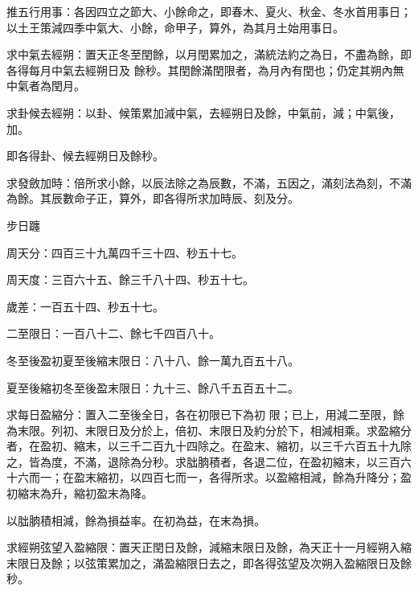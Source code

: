 \begin{pinyinscope}
 推五行用事：各因四立之節大、小餘命之，即春木、夏火、秋金、冬水首用事日；以土王策減四季中氣大、小餘，命甲子，算外，為其月土始用事日。



 求中氣去經朔：置天正冬至閏餘，以月閏累加之，滿統法約之為日，不盡為餘，即各得每月中氣去經朔日及
 餘秒。其閏餘滿閏限者，為月內有閏也；仍定其朔內無中氣者為閏月。



 求卦候去經朔：以卦、候策累加減中氣，去經朔日及餘，中氣前，減；中氣後，加。



 即各得卦、候去經朔日及餘秒。



 求發斂加時：倍所求小餘，以辰法除之為辰數，不滿，五因之，滿刻法為刻，不滿為餘。其辰數命子正，算外，即各得所求加時辰、刻及分。



 步日躔



 周天分：四百三十九萬四千三十四、秒五十七。



 周天度：三百六十五、餘三千八十四、秒五十七。



 歲差：一百五十四、秒五十七。



 二至限日：一百八十二、餘七千四百八十。



 冬至後盈初夏至後縮末限日：八十八、餘一萬九百五十八。



 夏至後縮初冬至後盈末限日：九十三、餘八千五百五十二。



 求每日盈縮分：置入二至後全日，各在初限已下為初
 限；已上，用減二至限，餘為末限。列初、末限日及分於上，倍初、末限日及約分於下，相減相乘。求盈縮分者，在盈初、縮末，以三千二百九十四除之。在盈末、縮初，以三千六百五十九除之，皆為度，不滿，退除為分秒。求朏朒積者，各退二位，在盈初縮末，以三百六十六而一；在盈末縮初，以四百七而一，各得所求。以盈縮相減，餘為升降分；盈初縮末為升，縮初盈末為降。



 以朏朒積相減，餘為損益率。在初為益，在末為損。



 求經朔弦望入盈縮限：置天正閏日及餘，減縮末限日及餘，為天正十一月經朔入縮末限日及餘；以弦策累加之，滿盈縮限日去之，即各得弦望及次朔入盈縮限日及餘秒。




\end{pinyinscope}
